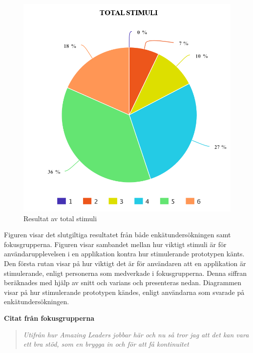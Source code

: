 \newpage
\begin{figure}[H]
  \centering
  \includegraphics[scale=0.4]{meta-chart-5.png}
  \captionsetup{justification=centering,margin=2cm}
  \caption{Resultat av total stimuli}
\end{figure} 
Figuren visar det slutgiltiga resultatet från både enkätundersökningen samt fokusgrupperna. Figuren visar sambandet mellan hur viktigt stimuli är för användarupplevelsen i en applikation kontra hur stimulerande prototypen känts. Den första rutan visar på hur viktigt det är för användaren att en applikation är stimulerande, enligt personerna som medverkade i fokusgrupperna. Denna siffran beräknades med hjälp av snitt och varians och presenteras nedan. Diagrammen visar på hur stimulerande prototypen kändes, enligt användarna som svarade på enkätundersökningen. 

\textbf{Citat från fokusgrupperna}

\begin{quotation}
\em  Utifrån hur Amazing Leaders jobbar här och nu så tror jag att det kan vara ett bra stöd, som en brygga in och för att få kontinuitet
\end{quotation}

